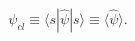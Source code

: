 \begin{equation}
  \psi_{cl}\equiv \langle s|\hat{\psi}|s \rangle
  \equiv\langle\hat{\psi}\rangle.
\end{equation}

